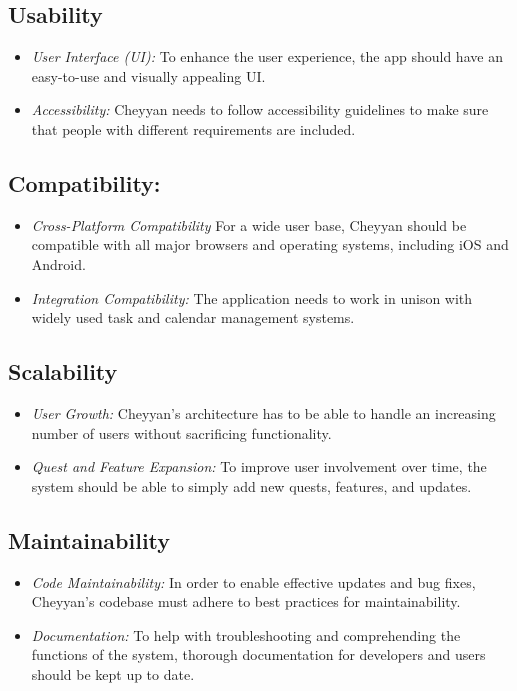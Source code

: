 \documentclass{l4proj}
\begin{document}
\subsection{Usability}
\begin{itemize}
    \item \textit{User Interface (UI):} To enhance the user experience, the app should have an easy-to-use and visually appealing UI.
    \item \textit{Accessibility:} Cheyyan needs to follow accessibility guidelines to make sure that people with different requirements are included.
\end{itemize}

\subsection{Compatibility:}
\begin{itemize}
    \item \textit{Cross-Platform Compatibility}  For a wide user base, Cheyyan should be compatible with all major browsers and operating systems, including iOS and Android.
    \item \textit{Integration Compatibility:} The application needs to work in unison with widely used task and calendar management systems.
\end{itemize}

\subsection{Scalability}
\begin{itemize}
    \item \textit{User Growth:} Cheyyan's architecture has to be able to handle an increasing number of users without sacrificing functionality.
    \item \textit{Quest and Feature Expansion:} To improve user involvement over time, the system should be able to simply add new quests, features, and updates.
\end{itemize}

\subsection{Maintainability}
\begin{itemize}
    \item \textit{Code Maintainability:}  In order to enable effective updates and bug fixes, Cheyyan's codebase must adhere to best practices for maintainability.
    \item \textit{Documentation:} To help with troubleshooting and comprehending the functions of the system, thorough documentation for developers and users should be kept up to date.
\end{itemize}
\end{document}
